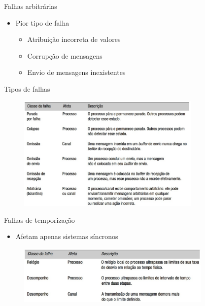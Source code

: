 \documentclass[aspectratio=169,
				xcolor=table]{beamer}
\begin{document}
	\begin{frame}{Falhas arbitrárias}
		\begin{itemize}
			\item Pior tipo de falha
			\begin{itemize}
				\item Atribuição incorreta de valores
				\item Corrupção de mensagens
				\item Envio de mensagens inexistentes
			\end{itemize}
		\end{itemize}
	\end{frame}
	
	\begin{frame}{Tipos de falhas}
		\begin{figure}[hbtp]
		\centering
		\includegraphics[width=0.80\textwidth, keepaspectratio]{../figs/cap03/falhas1.png}
		\end{figure}	
	\end{frame}
	
	
	\begin{frame}{Falhas de temporização}
		\begin{itemize}
			\item Afetam apenas sistemas síncronos
		\end{itemize}
		
		\begin{figure}[hbtp]
		\centering
		\includegraphics[width=0.85\textwidth, keepaspectratio]{../figs/cap03/falhas2.png}
		\end{figure}		
	\end{frame}
	
\end{document}

